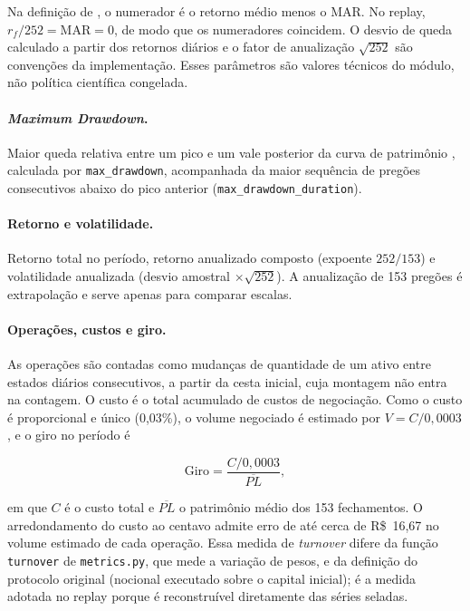 \noindent Na definição de \citet{Sortino1994}, o numerador é o retorno médio menos o MAR. No replay, $r_f/252 = \text{MAR} = 0$, de modo que os numeradores coincidem. O desvio de queda calculado a partir dos retornos diários e o fator de anualização $\sqrt{252}$ são convenções da implementação. Esses parâmetros são valores técnicos do módulo, não política científica congelada.

\paragraph*{\textit{Maximum Drawdown}.} Maior queda relativa entre um pico e um vale posterior da curva de patrimônio \citep{Magdon2004}, calculada por \texttt{max\_drawdown}, acompanhada da maior sequência de pregões consecutivos abaixo do pico anterior (\texttt{max\_drawdown\_duration}).

\paragraph*{Retorno e volatilidade.} Retorno total no período, retorno anualizado composto (expoente $252/153$) e volatilidade anualizada (desvio amostral $\times\sqrt{252}$). A anualização de 153 pregões é extrapolação e serve apenas para comparar escalas.

\paragraph*{Operações, custos e giro.} As operações são contadas como mudanças de quantidade de um ativo entre estados diários consecutivos, a partir da cesta inicial, cuja montagem não entra na contagem. O custo é o total acumulado de custos de negociação. Como o custo é proporcional e único (0,03\%), o volume negociado é estimado por $V = C / 0{,}0003$, e o giro no período é

\begin{equation}
\text{Giro} = \frac{C / 0{,}0003}{\overline{PL}},
\label{eq:met-giro}
\end{equation}

\noindent em que $C$ é o custo total e $\overline{PL}$ o patrimônio médio dos 153 fechamentos. O arredondamento do custo ao centavo admite erro de até cerca de R\$~16,67 no volume estimado de cada operação. Essa medida de \textit{turnover} difere da função \texttt{turnover} de \texttt{metrics.py}, que mede a variação de pesos, e da definição do protocolo original (nocional executado sobre o capital inicial); é a medida adotada no replay porque é reconstruível diretamente das séries seladas.

